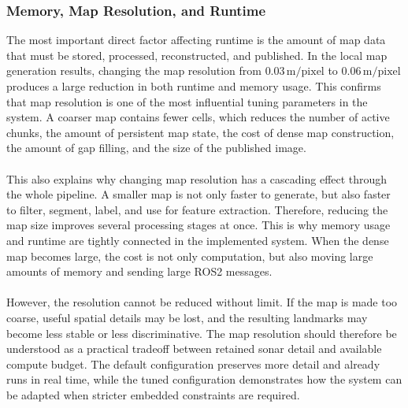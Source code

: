 \subsubsection{Memory, Map Resolution, and Runtime}
The most important direct factor affecting runtime is the amount of map data that must be stored, processed, reconstructed, and published. In the local map generation results, changing the map resolution from $0.03\,\mathrm{m/pixel}$ to $0.06\,\mathrm{m/pixel}$ produces a large reduction in both runtime and memory usage. This confirms that map resolution is one of the most influential tuning parameters in the system. A coarser map contains fewer cells, which reduces the number of active chunks, the amount of persistent map state, the cost of dense map construction, the amount of gap filling, and the size of the published image.
\\ \\
This also explains why changing map resolution has a cascading effect through the whole pipeline. A smaller map is not only faster to generate, but also faster to filter, segment, label, and use for feature extraction. Therefore, reducing the map size improves several processing stages at once. This is why memory usage and runtime are tightly connected in the implemented system. When the dense map becomes large, the cost is not only computation, but also moving large amounts of memory and sending large ROS2 messages.
\\ \\
However, the resolution cannot be reduced without limit. If the map is made too coarse, useful spatial details may be lost, and the resulting landmarks may become less stable or less discriminative. The map resolution should therefore be understood as a practical tradeoff between retained sonar detail and available compute budget. The default configuration preserves more detail and already runs in real time, while the tuned configuration demonstrates how the system can be adapted when stricter embedded constraints are required.

\newpage

